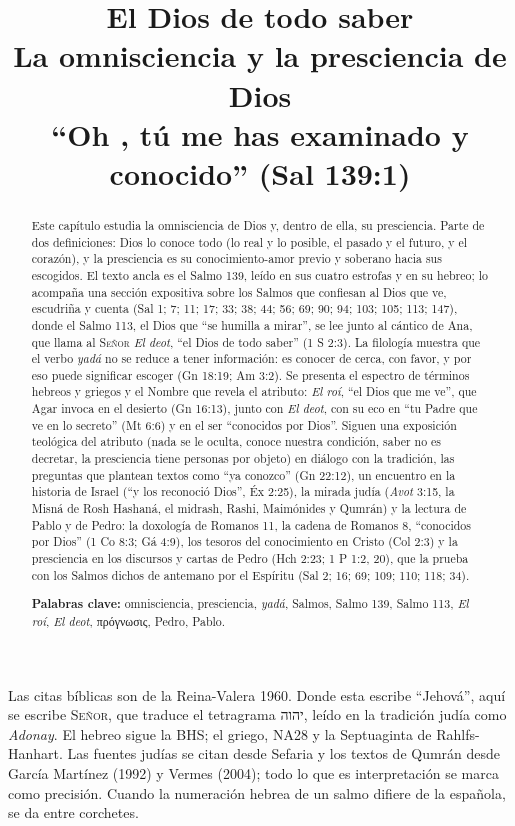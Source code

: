 \documentclass[11pt,letterpaper]{article}
\title{\color{azul}\bfseries El Dios de todo saber\\[4pt]\large\color{gris}\mdseries La omnisciencia y la presciencia de Dios\\[2pt]``Oh \SENOR{}, tú me has examinado y conocido'' (Sal 139:1)}
\author{}\date{}
\newcommand{\heb}[1]{\mbox{\foreignlanguage{hebrew}{#1}}}
\newcommand{\grc}[1]{\foreignlanguage{ancientgreek}{#1}}
\newcommand{\SENOR}{\textsc{Señor}}
\begin{document}
\maketitle\thispagestyle{empty}

\begin{abstract}\noindent
Este capítulo estudia la omnisciencia de Dios y, dentro de ella, su presciencia. Parte de dos definiciones: Dios lo conoce todo (lo real y lo posible, el pasado y el futuro, y el corazón), y la presciencia es su conocimiento-amor previo y soberano hacia sus escogidos. El texto ancla es el Salmo 139, leído en sus cuatro estrofas y en su hebreo; lo acompaña una sección expositiva sobre los Salmos que confiesan al Dios que ve, escudriña y cuenta (Sal 1; 7; 11; 17; 33; 38; 44; 56; 69; 90; 94; 103; 105; 113; 147), donde el Salmo 113, el Dios que ``se humilla a mirar'', se lee junto al cántico de Ana, que llama al \SENOR{} \emph{El deot}, ``el Dios de todo saber'' (1 S 2:3). La filología muestra que el verbo \emph{yadá} no se reduce a tener información: es conocer de cerca, con favor, y por eso puede significar escoger (Gn 18:19; Am 3:2). Se presenta el espectro de términos hebreos y griegos y el Nombre que revela el atributo: \emph{El roí}, ``el Dios que me ve'', que Agar invoca en el desierto (Gn 16:13), junto con \emph{El deot}, con su eco en ``tu Padre que ve en lo secreto'' (Mt 6:6) y en el ser ``conocidos por Dios''. Siguen una exposición teológica del atributo (nada se le oculta, conoce nuestra condición, saber no es decretar, la presciencia tiene personas por objeto) en diálogo con la tradición, las preguntas que plantean textos como ``ya conozco'' (Gn 22:12), un encuentro en la historia de Israel (``y los reconoció Dios'', Éx 2:25), la mirada judía (\emph{Avot} 3:15, la Misná de Rosh Hashaná, el midrash, Rashi, Maimónides y Qumrán) y la lectura de Pablo y de Pedro: la doxología de Romanos 11, la cadena de Romanos 8, ``conocidos por Dios'' (1 Co 8:3; Gá 4:9), los tesoros del conocimiento en Cristo (Col 2:3) y la presciencia en los discursos y cartas de Pedro (Hch 2:23; 1 P 1:2, 20), que la prueba con los Salmos dichos de antemano por el Espíritu (Sal 2; 16; 69; 109; 110; 118; 34).
\par\smallskip\noindent\textbf{Palabras clave:} omnisciencia, presciencia, \emph{yadá}, Salmos, Salmo 139, Salmo 113, \emph{El roí}, \emph{El deot}, \grc{πρόγνωσις}, Pedro, Pablo.\end{abstract}

\begin{nota}
Las citas bíblicas son de la Reina-Valera 1960. Donde esta escribe ``Jehová'', aquí se escribe \SENOR, que traduce el tetragrama \heb{יהוה}, leído en la tradición judía como \emph{Adonay}. El hebreo sigue la BHS; el griego, NA28 y la Septuaginta de Rahlfs-Hanhart. Las fuentes judías se citan desde Sefaria y los textos de Qumrán desde García Martínez (1992) y Vermes (2004); todo lo que es interpretación se marca como precisión. Cuando la numeración hebrea de un salmo difiere de la española, se da entre corchetes.
\end{nota}
\end{document}
